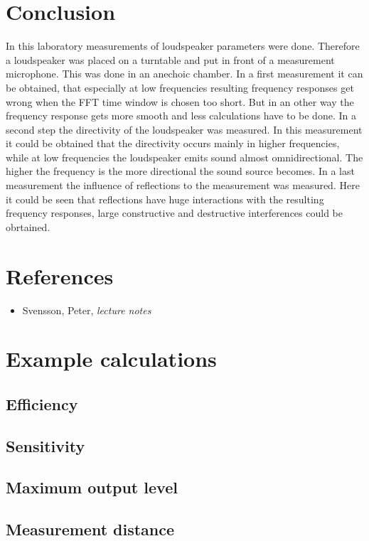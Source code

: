 \documentclass{article}
\begin{document}
\section{Conclusion}
In this laboratory measurements of loudspeaker parameters were done. Therefore a loudspeaker was placed on a turntable and put in front of a measurement microphone. This was done in an anechoic chamber. In a first measurement it can be obtained, that especially at low frequencies resulting frequency responses get wrong when the FFT time window is chosen too short. But in an other way the frequency response gets more smooth and less calculations have to be done. In a second step the directivity of the loudspeaker was measured. In this measurement it could be obtained that the directivity occurs mainly in higher frequencies, while at low frequencies the loudspeaker emits sound almost omnidirectional. The higher the frequency is the more directional the sound source becomes. In a last measurement the influence of reflections to the measurement was measured. Here it could be seen that reflections have huge interactions with the resulting frequency responses, large constructive and destructive interferences could be obrtained.

\newpage
\section*{References}
\footnotesize{
\begin{itemize}
\item Svensson, Peter, \textit{lecture notes}
\end{itemize}
}

\newpage
\appendix
\section{Example calculations}
\subsection{Efficiency}
\subsection{Sensitivity}
\subsection{Maximum output level}
\subsection{Measurement distance}
\end{document}
